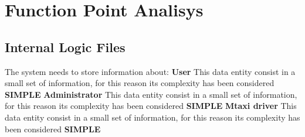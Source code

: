 \documentclass[11pt,titlepage]{article} %
\begin{document}
\section{Function Point Analisys}
  \subsection{Internal Logic Files}
     The system needs to store information about: \newline \newline
     \textbf{User}\newline
     This data entity consist in a small set of information, for this reason its complexity has been considered \textbf{SIMPLE}\newline\newline
     \textbf{Administrator}\newline
     This data entity consist in a small set of information, for this reason its complexity has been considered \textbf{SIMPLE}\newline\newline
     \textbf{Mtaxi driver}\newline
     This data entity consist in a small set of information, for this reason its complexity has been considered \textbf{SIMPLE}\newline\newline
     
     \newpage
     
\end{document}
